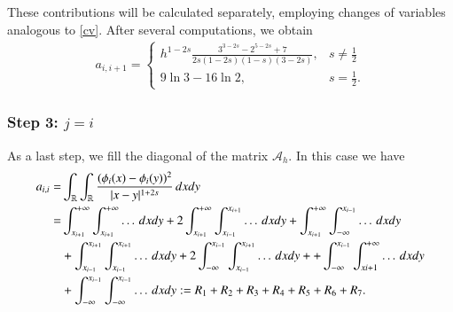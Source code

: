 These contributions will be calculated separately, employing changes of variables analogous to \eqref{cv}. After several computations, we obtain
\begin{align}\label{Aii1}
	a_{i,i+1} = \begin{cases}
					\displaystyle h^{1-2s}\frac{3^{3-2s}-2^{5-2s}+7}{2s(1-2s)(1-s)(3-2s)}, & \displaystyle s\neq \frac{1}{2}
					\\
					9\ln 3-16\ln 2, & \displaystyle s=\frac{1}{2}.
				\end{cases}	
\end{align}

\subsubsection*{Step 3: $j= i$}
As a last step, we fill the diagonal of the matrix $\mathcal A_h$. In this case we have
	\begin{align*}
	a_{i,i}= & \int_{\mathbb{R}}\int_{\mathbb{R}}\frac{(\phi_i(x)-\phi_i(y))^2}{|x-y|^{1+2s}}\,dxdy
	\\
	= & \int_{x_{i+1}}^{+\infty}\int_{x_{i+1}}^{+\infty} \ldots\,dxdy + 2\int_{x_{i+1}}^{+\infty}\int_{x_{i-1}}^{x_{i+1}} \ldots\,dxdy + \int_{x_{i+1}}^{+\infty}\int_{-\infty}^{x_{i-1}} \ldots\,dxdy 
	\\
	& + \int_{x_{i-1}}^{x_{i+1}}\int_{x_{i-1}}^{x_{i+1}} \ldots\,dxdy + 2\int_{-\infty}^{x_{i-1}}\int_{x_{i-1}}^{x_{i+1}} \ldots\,dxdy + + \int_{-\infty}^{x_{i-1}}\int_{x{i+1}}^{+\infty} \ldots\,dxdy 
	\\
	& +  \int_{-\infty}^{x_{i-1}}\int_{-\infty}^{x_{i-1}} \ldots\,dxdy := R_1 + R_2 + R_3 + R_4 + R_5 + R_6 + R_7.
\end{align*}

